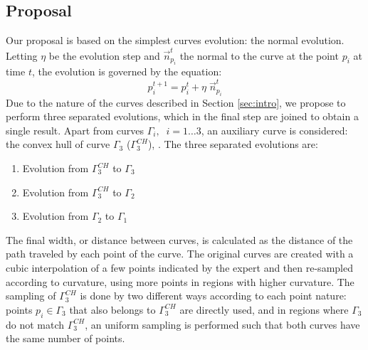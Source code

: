 \documentclass{article}
\begin{document}
\subsection{Proposal}
\label{ssec:proposal}
Our proposal is based on the simplest curves evolution: the normal
evolution. Letting $\eta$ be the evolution step and $\vec{n}_{p_i}^t$
the normal to the curve at the point $p_i$ at time $t$, the evolution
is governed by the equation:
\begin{equation}
  p_i^{t+1}=p_i^t+\eta \; \vec{n}_{p_i}^t
  \label{ec:normal}
\end{equation}
Due to the nature of the curves described in Section \ref{sec:intro}, we propose to perform three separated evolutions, which in the final step are joined to obtain a single result. Apart from curves $\Gamma_i,\;\; i=1\dots3$, an auxiliary curve is considered: the convex hull of curve $\Gamma_3$ ($\Gamma_3^{CH}$), \cite{libro}. The three separated evolutions are:
\begin{enumerate}
\item Evolution from $\Gamma_3^{CH}$ to $\Gamma_3$
\item Evolution from $\Gamma_3^{CH}$ to $\Gamma_2$
\item Evolution from $\Gamma_2$ to $\Gamma_1$
\end{enumerate}
The final width, or distance between curves, is calculated as the
distance of the path traveled by each point of the curve. The original
curves are created with a cubic interpolation of a few points
indicated by the expert and then re-sampled according to curvature,
using more points in regions with higher curvature. The sampling of
$\Gamma_3^{CH}$ is done by two different ways according to each point
nature: points $p_i\in\Gamma_{3}$ that also belongs to $\Gamma_3^{CH}$
are directly used, and in regions where $\Gamma_3$ do not match
$\Gamma_3^{CH}$, an uniform sampling is performed such that both
curves have the same number of points.
\end{document}
